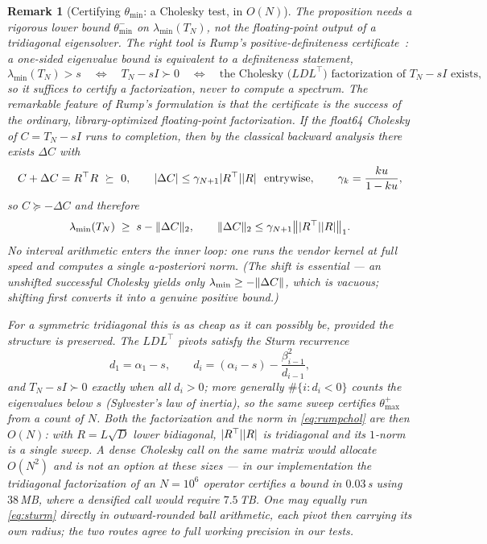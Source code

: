 \documentclass[11pt]{article}
\newtheorem{remark}[theorem]{Remark}
\DeclarePairedDelimiter{\norm}{\lVert}{\rVert}
\DeclarePairedDelimiter{\abs}{\lvert}{\rvert}
\begin{document}
\begin{remark}[Certifying $\theta_{\min}$: a Cholesky test, in $O(N)$]\label{rem:sturm}
The proposition needs a rigorous \emph{lower} bound $\theta_{\min}^-$ on $\lambda_{\min}(T_N)$, not the
floating-point output of a tridiagonal eigensolver. The right tool is Rump's positive-definiteness
certificate~\cite{Rump2006}: a one-sided eigenvalue bound is equivalent to a definiteness statement,
\[
  \lambda_{\min}(T_N)>s\quad\Longleftrightarrow\quad T_N-sI\succ0
  \quad\Longleftrightarrow\quad \text{the Cholesky (}LDL^\top\text{) factorization of }T_N-sI\text{ exists,}
\]
so it suffices to \emph{certify a factorization}, never to compute a spectrum. The remarkable feature
of Rump's formulation is that the certificate is the \emph{success of the ordinary, library-optimized
floating-point factorization}. If the float64 Cholesky of $C=T_N-sI$ runs to completion, then by the
classical backward analysis there exists $\Delta C$ with
\[
  C+\Delta C=R^\top R\ \succeq\ 0,\qquad \abs{\Delta C}\le\gamma_{N+1}\abs{R^\top}\abs{R}\ \ \text{entrywise},
  \qquad \gamma_k=\frac{ku}{1-ku},
\]
so $C\succeq-\Delta C$ and therefore
\begin{equation}\label{eq:rumpchol}
  \lambda_{\min}(T_N)\;\ge\;s-\norm{\Delta C}_2,\qquad
  \norm{\Delta C}_2\le\gamma_{N+1}\big\|\abs{R^\top}\abs{R}\big\|_1 .
\end{equation}
No interval arithmetic enters the inner loop: one runs the vendor kernel at full speed and computes a
single a-posteriori norm. (The shift is essential --- an \emph{unshifted} successful Cholesky yields
only $\lambda_{\min}\ge-\norm{\Delta C}$, which is vacuous; shifting first converts it into a genuine
positive bound.)

For a symmetric tridiagonal this is as cheap as it can possibly be, \emph{provided the structure is
preserved}. The $LDL^\top$ pivots satisfy the Sturm recurrence
\begin{equation}\label{eq:sturm}
  d_1=\alpha_1-s,\qquad d_i=(\alpha_i-s)-\frac{\beta_{i-1}^2}{d_{i-1}},
\end{equation}
and $T_N-sI\succ0$ exactly when all $d_i>0$; more generally $\#\{i:d_i<0\}$ counts the eigenvalues
below $s$ (Sylvester's law of inertia), so the same sweep certifies $\theta_{\max}^+$ from a count of
$N$. Both the factorization and the norm in \eqref{eq:rumpchol} are then $O(N)$: with $R=L\sqrt D$
lower bidiagonal, $\abs{R^\top}\abs{R}$ is tridiagonal and its $1$-norm is a single sweep. A dense
Cholesky call on the same matrix would allocate $O(N^2)$ and is not an option at these sizes --- in our
implementation the tridiagonal factorization of an $N=10^6$ operator certifies a bound in $0.03$\,s
using $38$\,MB, where a densified call would require $7.5$\,TB. One may equally run
\eqref{eq:sturm} directly in outward-rounded ball arithmetic, each pivot then carrying its own radius;
the two routes agree to full working precision in our tests.


\end{remark}
\end{document}
